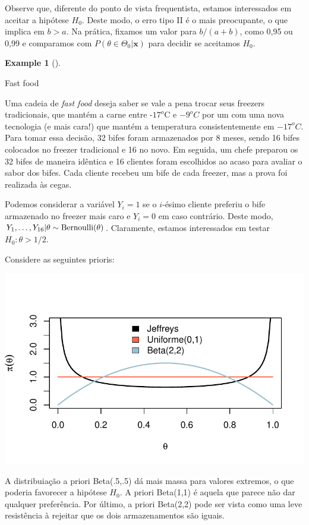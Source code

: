 \documentclass[
  letterpaper,
  DIV=11,
  numbers=noendperiod]{scrreprt}
\theoremstyle{definition}
\theoremstyle{plain}
\theoremstyle{definition}
\newtheorem{example}{Example}[chapter]
\theoremstyle{remark}
\begin{document}
Observe que, diferente do ponto de vista frequentista, estamos
interessados em aceitar a hipótese \(H_0\). Deste modo, o erro tipo II é
o mais preocupante, o que implica em \(b>a\). Na prática, fixamos um
valor para \(b/(a+b)\), como 0,95 ou 0,99 e comparamos com
\(P(\theta\in\Theta_0|\boldsymbol{x})\) para decidir se aceitamos
\(H_0\).

\begin{example}[]\protect\hypertarget{exm-}{}\label{exm-}

Fast food

Uma cadeia de \emph{fast food} deseja saber se vale a pena trocar seus
freezers tradicionais, que mantém a carne entre -\(17^o\)C e \(-9^oC\)
por um com uma nova tecnologia (e mais cara!) que mantém a temperatura
consistentemente em \(-17^oC\). Para tomar essa decisão, 32 bifes foram
armazenados por 8 meses, sendo 16 bifes colocados no freezer tradicional
e 16 no novo. Em seguida, um chefe preparou os 32 bifes de maneira
idêntica e 16 clientes foram escolhidos ao acaso para avaliar o sabor
dos bifes. Cada cliente recebeu um bife de cada freezer, mas a prova foi
realizada às cegas.

Podemos considerar a variável \(Y_i=1\) se o \(i\)-ésimo cliente
preferiu o bife armazenado no freezer mais caro e \(Y_i=0\) em caso
contrário. Deste modo,
\(Y_1,\ldots,Y_{16}|\theta\sim\hbox{Bernoulli}(\theta)\). Claramente,
estamos interessados em testar \(H_0:\theta>1/2\).

Considere as seguintes prioris:

\includegraphics{teste_files/figure-pdf/unnamed-chunk-1-1.pdf}

A distribuiação a priori Beta(.5,.5) dá mais massa para valores
extremos, o que poderia favorecer a hipótese \(H_0\). A priori Beta(1,1)
é aquela que parece não dar qualquer preferência. Por último, a priori
Beta(2,2) pode ser vista como uma leve resistência à rejeitar que os
dois armazenamentos são iguais.


\end{example}
\end{document}
